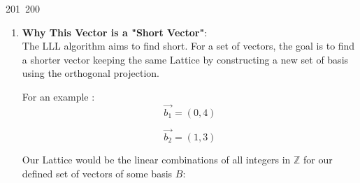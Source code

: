 201~200~\documentclass{article}
\begin{document}
\begin{enumerate}
	                                                                        	                                                                    	                \item \textbf{Why This Vector is a "Short Vector"}: \\
	                                                                        	                                                                    	                    The LLL algorithm aims to find short. For a set of vectors, the goal is to find a shorter vector keeping the same Lattice by constructing a new set of basis using the orthogonal projection. 

	                                                                        	                                                                    	                            For an example :
	                                                                        	                                                                    	                                \[
	                                                                        	                                                                    	                                	        \Vec{b_1} = (0,4)
	                                                                        	                                                                    	                                	            \]

	                                                                        	                                                                    	                                	                    \[
	                                                                        	                                                                    	                                	                    	        \Vec{b_2} = (1,3)
	                                                                        	                                                                    	                                	                    	            \]


	                                                                        	                                                                    	                                	                    	                Our Lattice would be the linear combinations of all integers in $\mathbb{Z}$ for our defined set of vectors of some basis $B$:



\end{enumerate}
\end{document}
